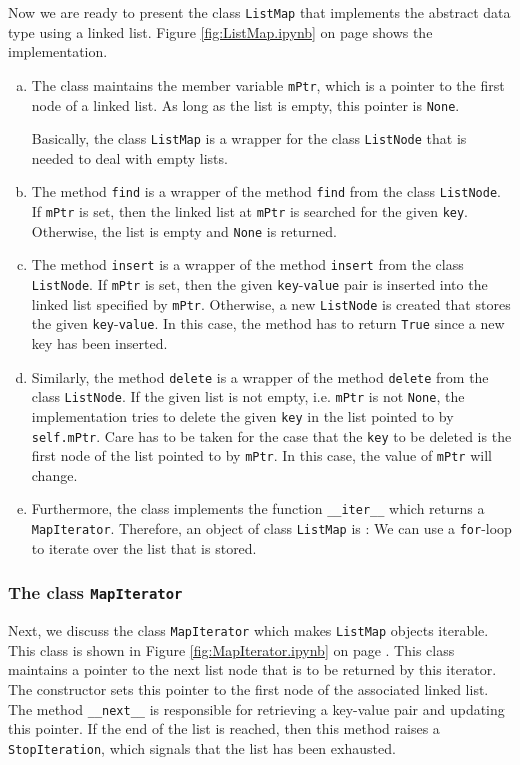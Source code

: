 Now we are ready to present the class \texttt{ListMap} that implements the abstract data type  using a
linked list.  Figure \ref{fig:ListMap.ipynb} on page \pageref{fig:ListMap.ipynb} shows the implementation.
\begin{enumerate}[(a)]
\item The class maintains the  member variable \texttt{mPtr}, which is a pointer to the first node of a linked
      list.  As long as the list is empty, this pointer is \texttt{None}.

      Basically, the class \texttt{ListMap} is a wrapper for the class \texttt{ListNode} that is needed to deal
      with empty lists.
\item The method \texttt{find} is a wrapper of the method \texttt{find} from the class \texttt{ListNode}.
      If \texttt{mPtr} is set, then the linked list at \texttt{mPtr} is searched for the given \texttt{key}.
      Otherwise, the list is empty and \texttt{None} is returned.
\item The method \texttt{insert} is a wrapper of the method \texttt{insert} from the class \texttt{ListNode}.
      If \texttt{mPtr} is set, then the given \texttt{key}-\texttt{value} pair is inserted into the
      linked list specified by \texttt{mPtr}.
      Otherwise, a new \texttt{ListNode} is created that stores the given  \texttt{key}-\texttt{value}.
      In this case, the method has to return \texttt{True} since a new key has been inserted.
\item Similarly, the method \texttt{delete} is a wrapper of the method \texttt{delete} from the class
      \texttt{ListNode}.  If the given list is not empty, i.e. \texttt{mPtr} is not \texttt{None},
      the implementation tries to delete the given \texttt{key} in the list pointed to by \texttt{self.mPtr}.
      Care has to be taken for the case that the \texttt{key} to be deleted is the first node of the
      list pointed to by \texttt{mPtr}.  In this case, the value of \texttt{mPtr} will change.
\item Furthermore, the class implements the function \texttt{\_\_iter\_\_} which returns a
      \texttt{MapIterator}.  Therefore, an object of class \texttt{ListMap} is : We can
      use a \texttt{for}-loop to iterate over the list that is stored.  
\end{enumerate}
\subsubsection{The class \texttt{MapIterator}}
Next, we discuss the class \texttt{MapIterator} which makes \texttt{ListMap} objects iterable.
This class is shown in Figure \ref{fig:MapIterator.ipynb} on page \pageref{fig:MapIterator.ipynb}.
This class maintains a pointer to the next list node that is to be returned by this iterator.
The constructor sets this pointer to the first node of the associated linked list.
The method \texttt{\_\_next\_\_} is responsible for retrieving a key-value pair and updating this pointer.
If the end of the list is reached, then this method raises a \texttt{StopIteration}, which signals that the
list has been exhausted.

